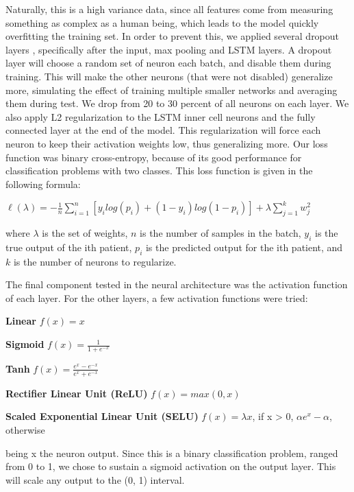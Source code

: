% 

Naturally, this is a high variance data, since all features come from measuring something as complex as a human being, which leads to the model quickly overfitting the training set. In order to prevent this, we applied several dropout layers \cite{srivastava2014dropout}, specifically after the input, max pooling and LSTM layers. A dropout layer will choose a random set of neuron each batch, and disable them during training. This will make the other neurons (that were not disabled) generalize more, simulating the effect of training multiple smaller networks and averaging them during test. We drop from 20 to 30 percent of all neurons on each layer. We also apply L2 regularization \cite{wager2013dropout} to the LSTM inner cell neurons and the fully connected layer at the end of the model. This regularization will force each neuron to keep their activation weights low, thus generalizing more. Our loss function was binary cross-entropy, because of its good performance for classification problems with two classes. This loss function is given in the following formula:
\begin{center}
	$ \ell(\lambda) = -\frac{1}{n} \sum_{i=1}^{n}[y_{i}log(p_{i}) + (1 - y_{i})log(1 - p_{i})] + \lambda\sum_{j=1}^{k}w_{j}^2 $
\end{center}
where $ \lambda $ is the set of weights, $ n $ is the number of samples in the batch, $ y_{i} $ is the true output of the ith patient, $ p_{i} $ is the predicted output for the ith patient, and $ k $ is the number of neurons to regularize.

The final component tested in the neural architecture was the activation function of each layer. For the other layers, a few activation functions were tried: 
\begin{description}
	\item \textbf{Linear} $ f(x) = x $
	\item \textbf{Sigmoid} $ f(x) = \frac{1}{1 + e^{-x}} $
	\item \textbf{Tanh} $ f(x) = \frac{e^{x} - e^{-x}}{e^{x} + e^{-x}} $
	\item \textbf{Rectifier Linear Unit (ReLU)} $ f(x) = max(0, x) $
	\item \textbf{Scaled Exponential Linear Unit (SELU)} $ f(x) = \lambda x $, if x > 0, $ \alpha e^x - \alpha $, otherwise 
\end{description}
being x the neuron output. Since this is a binary classification problem, ranged from 0 to 1, we chose to sustain a sigmoid activation on the output layer. This will scale any output to the (0, 1) interval. 

